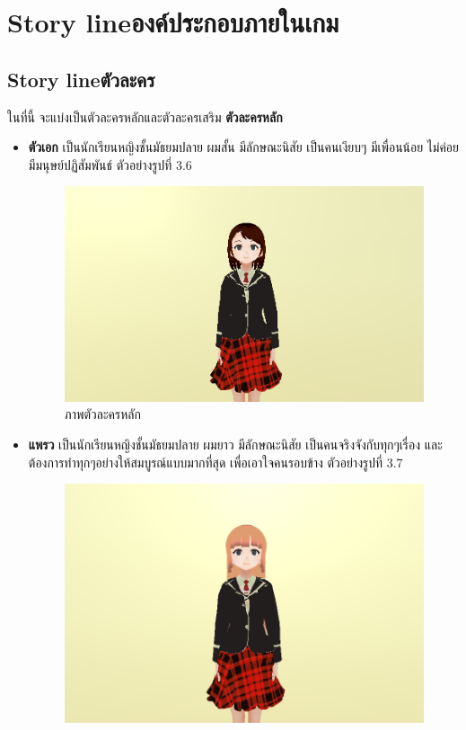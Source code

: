 \section{\ifenglish Story line\else องค์ประกอบภายในเกม\fi }
\subsection{\ifenglish Story line\else ตัวละคร\fi }
ในที่นี้ จะแบ่งเป็นตัวละครหลักและตัวละครเสริม
\subitem \textbf{ตัวละครหลัก}
\begin{itemize}
    \item \textbf{ตัวเอก} เป็นนักเรียนหญิงชั้นมัธยมปลาย ผมสั้น มีลักษณะนิสัย เป็นคนเงียบๆ มีเพื่อนน้อย ไม่ค่อยมีมนุษย์ปฏิสัมพันธ์ ตัวอย่างรูปที่ 3.6
    \begin{figure}[h]
        \centering
        \includegraphics[scale=0.5]{Images/main char image.png}
        \caption{ภาพตัวละครหลัก}\label{MainCharacter}
    \end{figure}
    \item \textbf{แพรว} เป็นนักเรียนหญิงชั้นมัธยมปลาย ผมยาว มีลักษณะนิสัย เป็นคนจริงจังกับทุกๆเรื่อง และต้องการทำทุกๆอย่างให้สมบูรณ์แบบมากที่สุด เพื่อเอาใจคนรอบข้าง ตัวอย่างรูปที่ 3.7
    \begin{figure}[h]
        \centering
        \includegraphics[scale=0.5]{Images/Preaw Image.png}

\end{figure}
\end{itemize}

